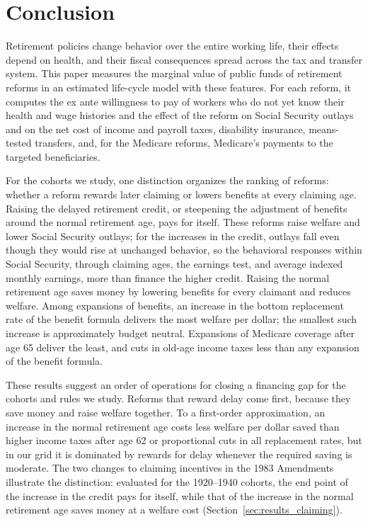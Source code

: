 \section{Conclusion}
\label{sec:conclusion}

Retirement policies change behavior over the entire working life, their effects depend on health, and their fiscal consequences spread across the tax and transfer system. This paper measures the marginal value of public funds of retirement reforms in an estimated life-cycle model with these features. For each reform, it computes the ex ante willingness to pay of workers who do not yet know their health and wage histories and the effect of the reform on Social Security outlays and on the net cost of income and payroll taxes, disability insurance, means-tested transfers, and, for the Medicare reforms, Medicare's payments to the targeted beneficiaries.

For the cohorts we study, one distinction organizes the ranking of reforms: whether a reform rewards later claiming or lowers benefits at every claiming age. Raising the delayed retirement credit, or steepening the adjustment of benefits around the normal retirement age, pays for itself. These reforms raise welfare and lower Social Security outlays; for the increases in the credit, outlays fall even though they would rise at unchanged behavior, so the behavioral responses within Social Security, through claiming ages, the earnings test, and average indexed monthly earnings, more than finance the higher credit. Raising the normal retirement age saves money by lowering benefits for every claimant and reduces welfare. Among expansions of benefits, an increase in the bottom replacement rate of the benefit formula delivers the most welfare per dollar; the smallest such increase is approximately budget neutral. Expansions of Medicare coverage after age 65 deliver the least, and cuts in old-age income taxes less than any expansion of the benefit formula.

These results suggest an order of operations for closing a financing gap for the cohorts and rules we study. Reforms that reward delay come first, because they save money and raise welfare together. To a first-order approximation, an increase in the normal retirement age costs less welfare per dollar saved than higher income taxes after age 62 or proportional cuts in all replacement rates, but in our grid it is dominated by rewards for delay whenever the required saving is moderate. The two changes to claiming incentives in the 1983 Amendments illustrate the distinction: evaluated for the 1920--1940 cohorts, the end point of the increase in the credit pays for itself, while that of the increase in the normal retirement age saves money at a welfare cost (Section~\ref{sec:results_claiming}).

